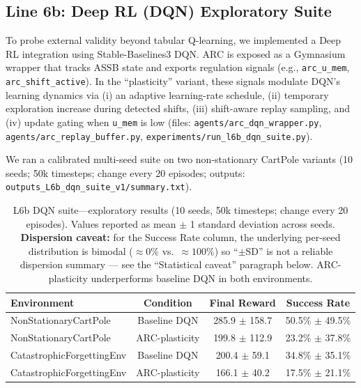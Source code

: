 \documentclass{article}
\begin{document}
\FloatBarrier
\subsection{Line 6b: Deep RL (DQN) Exploratory Suite}\label{sec:dqn_suite}

To probe external validity beyond tabular Q-learning, we implemented a Deep RL integration using Stable-Baselines3 DQN. ARC is exposed as a Gymnasium wrapper that tracks ASSB state and exports regulation signals (e.g., \texttt{arc\_u\_mem}, \texttt{arc\_shift\_active}). In the ``plasticity'' variant, these signals modulate DQN's learning dynamics via (i) an adaptive learning-rate schedule, (ii) temporary exploration increase during detected shifts, (iii) shift-aware replay sampling, and (iv) update gating when \texttt{u\_mem} is low (files: \texttt{agents/arc\_dqn\_wrapper.py}, \texttt{agents/arc\_replay\_buffer.py}, \texttt{experiments/run\_l6b\_dqn\_suite.py}).

We ran a calibrated multi-seed suite on two non-stationary CartPole variants (10 seeds; 50k timesteps; change every 20 episodes; outputs: \texttt{outputs\_L6b\_dqn\_suite\_v1/summary.txt}).

\begin{table}[H]
\centering
\footnotesize
\caption{L6b DQN suite---exploratory results (10 seeds, 50k timesteps; change every 20 episodes). Values reported as mean $\pm$ 1 standard deviation across seeds. \textbf{Dispersion caveat:} for the Success Rate column, the underlying per-seed distribution is bimodal ($\approx 0\%$ vs.\ $\approx 100\%$) so ``$\pm$SD'' is not a reliable dispersion summary --- see the ``Statistical caveat'' paragraph below. ARC-plasticity underperforms baseline DQN in both environments.}
\label{tab:g13_l6b_dqn}
\begin{tabular}{@{}lccc@{}}
\toprule
Environment & Condition & Final Reward & Success Rate \\ \midrule
NonStationaryCartPole & Baseline DQN & 285.9 $\pm$ 158.7 & 50.5\% $\pm$ 49.5\% \\
NonStationaryCartPole & ARC-plasticity & 199.8 $\pm$ 112.9 & 23.2\% $\pm$ 37.8\% \\
CatastrophicForgettingEnv & Baseline DQN & 200.4 $\pm$ 59.1 & 34.8\% $\pm$ 35.1\% \\
CatastrophicForgettingEnv & ARC-plasticity & 166.1 $\pm$ 40.2 & 17.5\% $\pm$ 21.1\% \\ \bottomrule
\end{tabular}
\end{table}
\end{document}
